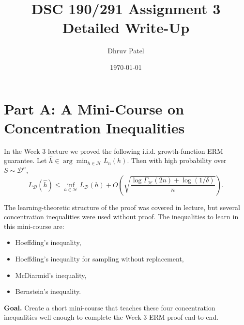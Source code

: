 \documentclass[11pt]{article}
\title{\textbf{DSC 190/291 Assignment 3}\\Detailed Write-Up}
\author{Dhruv Patel}
\date{\today}
\begin{document}
\maketitle
\tableofcontents
\newpage

\section{Part A: A Mini-Course on Concentration Inequalities}
In the Week 3 lecture we proved the following i.i.d. growth-function ERM guarantee. Let $\hat h \in \arg\min_{h\in\mathcal H} L_n(h)$. Then with high probability over $S\sim \mathcal D^n$,
\[
L_{\mathcal D}(\hat h)
\le
\inf_{h\in\mathcal H} L_{\mathcal D}(h)
+
O\!\left(\sqrt{\frac{\log \Gamma_{\mathcal H}(2n)+\log(1/\delta)}{n}}\right).
\]

The learning-theoretic structure of the proof was covered in lecture, but several concentration inequalities were used without proof. The inequalities to learn in this mini-course are:
\begin{itemize}[leftmargin=2em]
\item Hoeffding's inequality,
\item Hoeffding's inequality for sampling without replacement,
\item McDiarmid's inequality,
\item Bernstein's inequality.
\end{itemize}

\textbf{Goal.} Create a short mini-course that teaches these four concentration inequalities well enough to complete the Week 3 ERM proof end-to-end.

\vspace{1em}
\end{document}
